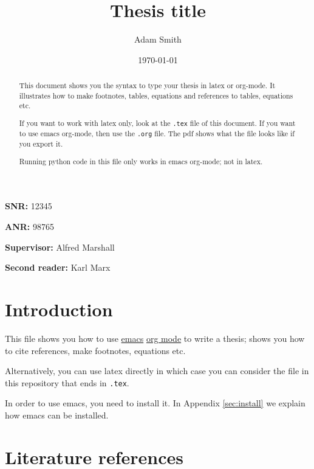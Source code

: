 \documentclass[11pt]{article}
\author{Adam Smith}
\date{\today}
\title{Thesis title}
\begin{document}
\maketitle
\begin{abstract}
This document shows you the syntax to type your thesis in latex or org-mode. It illustrates how to make footnotes, tables, equations and references to tables, equations etc.

If you want to work with latex only, look at the \texttt{.tex} file of this document. If you want to use emacs org-mode, then use the \texttt{.org} file. The pdf shows what the file looks like if you export it.

Running python code in this file only works in emacs org-mode; not in latex.
\end{abstract}


\vspace{10mm}

\textbf{SNR:} 12345

\textbf{ANR:} 98765

\vspace{10mm}
\textbf{Supervisor:} Alfred Marshall

\textbf{Second reader:} Karl Marx



\newpage



\setcounter{tocdepth}{2}
\tableofcontents

\newpage

\section{Introduction}
\label{sec:orgda66704}
\label{sec:intro}

This file shows you how to use \href{https://www.gnu.org/software/emacs/}{emacs} \href{https://orgmode.org/}{org mode} to write a thesis; shows you how to cite references, make footnotes, equations etc.

Alternatively, you can use latex directly in which case you can consider the file in this repository that ends in \texttt{.tex}.

In order to use emacs, you need to install it. In Appendix \ref{sec:install} we explain how emacs can be installed.


\section{Literature references}
\label{sec:org8f5d973}
\end{document}
